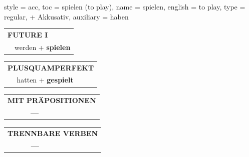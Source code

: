 \begin{verbentry}{
  style = {acc},
  toc = {spielen (to play)},
  name = {spielen},
  english = {to play},
  type = {regular, + Akkusativ},
  auxiliary = {haben}
}
\begin{tabular}{rl}
    \multicolumn{2}{l}{\textbf{FUTURE I} }\\
  &  werden + \textbf{spielen}\\
 
  \end{tabular}
\hfill
   \begin{tabular}{rl}
      \multicolumn{2}{l}{\textbf{PLUSQUAMPERFEKT}}\\
   & hatten + \textbf{gespielt}\\
  \end{tabular}
  
  
\vspace{10pt}

\begin{tabular}{lll}
\multicolumn{3}{l}{\textbf{MIT PRÄPOSITIONEN}}\\
& \textbf{---} & \\
\end{tabular}
\hfill
\begin{tabular}{lll}
\multicolumn{3}{l}{\textbf{TRENNBARE VERBEN}}\\
& \textbf{---} & \\
\end{tabular}
\vspace{-5pt}
\end{verbentry}

